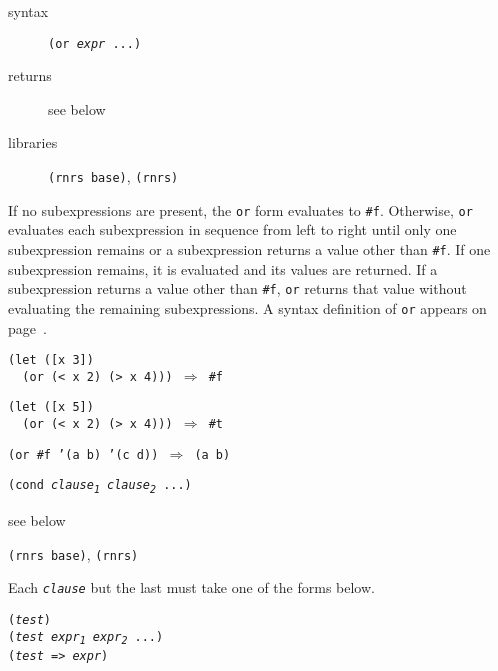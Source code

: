 \begin{description}

\label{control_s12}\item[syntax] \texttt{(or \textit{expr} ...)}



\item[returns] see below


\item[libraries] \texttt{(rnrs base)}, \texttt{(rnrs)}
\end{description}


If no subexpressions are present, the \texttt{or} form evaluates to \texttt{\#{}f}.
Otherwise, \texttt{or} evaluates each subexpression in sequence from left to right
until only one subexpression remains or a subexpression returns a value other
than \texttt{\#{}f}.
If one subexpression remains, it is evaluated and its values are returned.
If a subexpression returns a value other than \texttt{\#{}f}, \texttt{or} returns
that value without evaluating the remaining subexpressions.
A syntax definition of \texttt{or} appears on page \pageref{further_defn_or}.


\begin{alltt}
(let ([x 3])
  (or (\textless{} x 2) (\textgreater{} x 4))) \(\Rightarrow\) \#{}f

(let ([x 5])
  (or (\textless{} x 2) (\textgreater{} x 4))) \(\Rightarrow\) \#{}t

(or \#{}f '(a b) '(c d)) \(\Rightarrow\) (a b)
\end{alltt}

\begin{description}

\label{control_s13}\item[syntax] \texttt{(cond \textit{clause\textsubscript{1}} \textit{clause\textsubscript{2}} ...)}



\item[returns] see below


\item[libraries] \texttt{(rnrs base)}, \texttt{(rnrs)}
\end{description}


Each \texttt{\textit{clause}} but the last must take one of the forms
\label{control_s14}below.


\begin{alltt}
(\textit{test})
(\textit{test} \textit{expr\textsubscript{1}} \textit{expr\textsubscript{2}} ...)
(\textit{test} =\textgreater{} \textit{expr})
\end{alltt}


